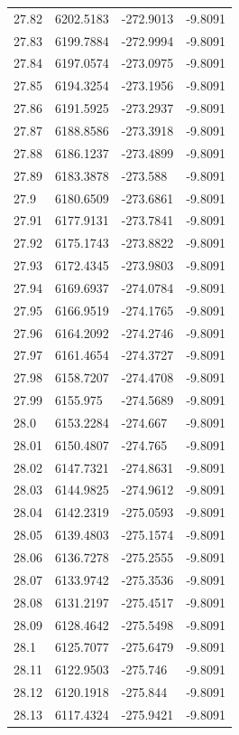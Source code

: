 \begin{table}[H]
\begin{tabular}{llll}
27.82 & 6202.5183 & -272.9013 & -9.8091 \\
27.83 & 6199.7884 & -272.9994 & -9.8091 \\
27.84 & 6197.0574 & -273.0975 & -9.8091 \\
27.85 & 6194.3254 & -273.1956 & -9.8091 \\
27.86 & 6191.5925 & -273.2937 & -9.8091 \\
27.87 & 6188.8586 & -273.3918 & -9.8091 \\
27.88 & 6186.1237 & -273.4899 & -9.8091 \\
27.89 & 6183.3878 & -273.588 & -9.8091 \\
27.9 & 6180.6509 & -273.6861 & -9.8091 \\
27.91 & 6177.9131 & -273.7841 & -9.8091 \\
27.92 & 6175.1743 & -273.8822 & -9.8091 \\
27.93 & 6172.4345 & -273.9803 & -9.8091 \\
27.94 & 6169.6937 & -274.0784 & -9.8091 \\
27.95 & 6166.9519 & -274.1765 & -9.8091 \\
27.96 & 6164.2092 & -274.2746 & -9.8091 \\
27.97 & 6161.4654 & -274.3727 & -9.8091 \\
27.98 & 6158.7207 & -274.4708 & -9.8091 \\
27.99 & 6155.975 & -274.5689 & -9.8091 \\
28.0 & 6153.2284 & -274.667 & -9.8091 \\
28.01 & 6150.4807 & -274.765 & -9.8091 \\
28.02 & 6147.7321 & -274.8631 & -9.8091 \\
28.03 & 6144.9825 & -274.9612 & -9.8091 \\
28.04 & 6142.2319 & -275.0593 & -9.8091 \\
28.05 & 6139.4803 & -275.1574 & -9.8091 \\
28.06 & 6136.7278 & -275.2555 & -9.8091 \\
28.07 & 6133.9742 & -275.3536 & -9.8091 \\
28.08 & 6131.2197 & -275.4517 & -9.8091 \\
28.09 & 6128.4642 & -275.5498 & -9.8091 \\
28.1 & 6125.7077 & -275.6479 & -9.8091 \\
28.11 & 6122.9503 & -275.746 & -9.8091 \\
28.12 & 6120.1918 & -275.844 & -9.8091 \\
28.13 & 6117.4324 & -275.9421 & -9.8091 \\

\end{tabular}
\end{table}
